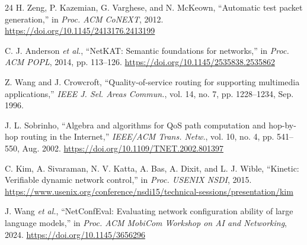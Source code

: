 \documentclass[conference]{IEEEtran}
\begin{document}
\begin{thebibliography}{24}
 H. Zeng, P. Kazemian, G. Varghese, and N. McKeown,
``Automatic test packet generation,'' in \emph{Proc. ACM CoNEXT}, 2012.
\url{https://doi.org/10.1145/2413176.2413199}

 C. J. Anderson \emph{et al.}, ``NetKAT:
Semantic foundations for networks,'' in \emph{Proc. ACM POPL}, 2014,
pp. 113--126. \url{https://doi.org/10.1145/2535838.2535862}

 Z. Wang and J. Crowcroft, ``Quality-of-service routing
for supporting multimedia applications,'' \emph{IEEE J. Sel. Areas Commun.},
vol. 14, no. 7, pp. 1228--1234, Sep. 1996.

 J. L. Sobrinho, ``Algebra and algorithms for QoS
path computation and hop-by-hop routing in the Internet,'' \emph{IEEE/ACM
Trans. Netw.}, vol. 10, no. 4, pp. 541--550, Aug. 2002.
\url{https://doi.org/10.1109/TNET.2002.801397}

 C. Kim, A. Sivaraman, N. V. Katta, A. Bas, A. Dixit,
and L. J. Wible, ``Kinetic: Verifiable dynamic network control,'' in
\emph{Proc. USENIX NSDI}, 2015.
\url{https://www.usenix.org/conference/nsdi15/technical-sessions/presentation/kim}

 J. Wang \emph{et al.}, ``NetConfEval: Evaluating
network configuration ability of large language models,'' in \emph{Proc. ACM
MobiCom Workshop on AI and Networking}, 2024.
\url{https://doi.org/10.1145/3656296}
\end{thebibliography}
\end{document}
